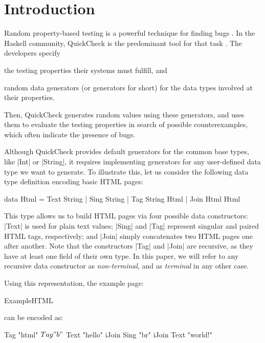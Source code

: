 \section{Introduction}
\label{sec:intro}

%
Random property-based testing is a powerful technique for finding bugs
\cite{ArtsHNS15, HughesPAN16, HughesNSA16, MidtgaardJKNN17}.
%
In the Haskell community, QuickCheck is the predominant tool for that task
\cite{ClaessenH00}.
%
The developers specify
%
\begin{inparaenum}[(i)]
\item the testing properties their systems must fulfill, and
\item random data generators (or generators for short) for the data types
  involved at their properties.
\end{inparaenum}
%
Then, QuickCheck generates random values using these generators, and uses them
to evaluate the testing properties in search of possible counterexamples, which
often indicate the presence of bugs.


%
Although QuickCheck provides default generators for the common base types, like
|Int| or |String|, it requires implementing generators for any user-defined data
type we want to generate.
%
%
To illustrate this, let us consider the following data type definition encoding
basic HTML pages:

\begin{code}
data Html  =  Text  String
           |  Sing  String
           |  Tag   String Html
           |  Join  Html Html
\end{code}
%
This type allows us to build HTML pages via four possible data constructors:
|Text| is used for plain text values; |Sing| and |Tag| represent singular and
paired HTML tags, respectively; and |Join| simply concatenates two HTML pages
one after another.
%
Note that the constructors |Tag| and |Join| are recursive, as they have at least
one field of their own type.
%
In this paper, we will refer to any recursive data constructor as
\emph{non-terminal}, and as \emph{terminal} in any other case.


Using this representation, the example page:

\begin{code}
ExampleHTML
\end{code}
%
can be encoded as:
%
\begin{code}
Tag "html" $ Tag "b" $
  Text "hello" iJoin Sing "br" iJoin Text "world!"
\end{code} %

